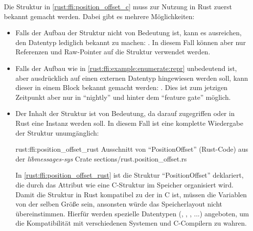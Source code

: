 Die Struktur in \autoref{rust:ffi:position_offset_c} muss zur Nutzung in Rust zuerst bekannt gemacht werden.
Dabei gibt es mehrere Möglichkeiten:
\begin{itemize}
	\item Falls der Aufbau der Struktur nicht von Bedeutung ist, kann es ausreichen, den Datentyp lediglich bekannt zu machen: .
	In diesem Fall können aber nur Referenzen und Raw-Pointer auf die Struktur verwendet werden.
	\label{rust:ffi:example:enumerate:repr}
	
	\item Falls der Aufbau wie in \autoref{rust:ffi:example:enumerate:repr} unbedeutend ist, aber ausdrücklich auf einen externen Datentyp hingewiesen werden soll, kann dieser in einem  Block bekannt gemacht werden:  \cite{rust:github:extern_type}.
	Dies ist zum jetzigen Zeitpunkt aber nur in \enquote{nightly} und hinter dem \enquote{feature gate}  möglich.
	
	\item Der Inhalt der Struktur ist von Bedeutung, da darauf zugegriffen oder in Rust eine Instanz werden soll. In diesem Fall ist eine komplette Wiedergabe der Struktur unumgänglich:
	
	\rustcinclude
		{rust:ffi:position_offset_rust}
		{Ausschnitt von \enquote{PositionOffset} (Rust-Code) aus der \textit{libmessages-sys} Crate}
		{sections/rust.position_offset.rs}
	
	In \autoref{rust:ffi:position_offset_rust} ist die Struktur \enquote{PositionOffset} deklariert,
	die durch das Attribut \rustcinline{#[repr(C)]} wie eine C-Struktur im Speicher organisiert wird.
	Damit die Struktur in Rust kompatibel zu der in C ist, müssen die Variablen von der selben Größe sein, ansonsten würde das Speicherlayout nicht übereinstimmen.
	Hierfür werden spezielle Datentypen (, , , ...) angeboten, um die Kompatibilität mit verschiedenen Systemen und C-Compilern zu wahren.
	
	
	

\end{itemize}
